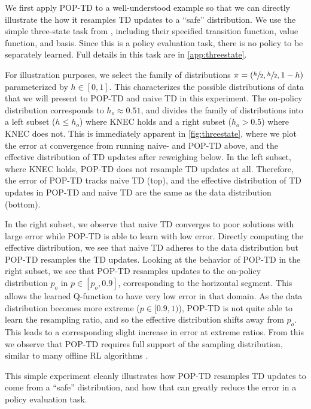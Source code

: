 We first apply POP-TD to a well-understood example so that we can directly illustrate the how it resamples TD updates to a ``safe'' distribution. We use the simple three-state task from \cite{manek2022pitfalls}, including their specified transition function, value function, and basis. Since this is a policy evaluation task, there is no policy to be separately learned. Full details in this task are in \cref{app:threestate}.

For illustration purposes, we select the family of distributions $\pi = (\sfrac h 2, \sfrac h 2, 1- h)$ parameterized by $h \in [0, 1]$.
This characterizes the possible distributions of data that we will present to POP-TD and naive TD in this experiment. The on-policy distribution corresponds to $h_o\approx 0.51$, and divides the family of distributions into a left subset ($h \leq h_o$) where KNEC holds and a right subset ($h_o > 0.5$) where KNEC does not. This is immediately apparent in \cref{fig:threestate}, where we plot the error at convergence from running naive- and POP-TD above, and the effective distribution of TD updates after reweighing below.
In the left subset, where KNEC holds, POP-TD does not resample TD updates at all. Therefore, the error of POP-TD tracks naive TD (top), and the effective distribution of TD updates in POP-TD and naive TD are the same as the data distribution (bottom).

In the right subset, we observe that naive TD converges to poor solutions with large error while POP-TD is able to learn with low error.
Directly computing the effective distribution, we see that naive TD adheres to the data distribution but POP-TD resamples the TD updates.
Looking at the behavior of POP-TD in the right subset, we see that POP-TD resamples updates to the on-policy distribution $p_o$ in $p\in[p_o,0.9]$, corresponding to the horizontal segment. This allows the learned Q-function to have very low error in that domain. As the data distribution becomes more extreme ($p\in [0.9, 1)$), POP-TD is not quite able to learn the resampling ratio, and so the effective distribution shifts away from $p_o$. This leads to a corresponding slight increase in error at extreme ratios. From this we observe that POP-TD requires full support of the sampling distribution, similar to many offline RL algorithms \cite{kumar2020cql,shi2022pessimistic}.

This simple experiment cleanly illustrates how POP-TD resamples TD updates to come from a ``safe'' distribution, and how that can greatly reduce the error in a policy evaluation task.

